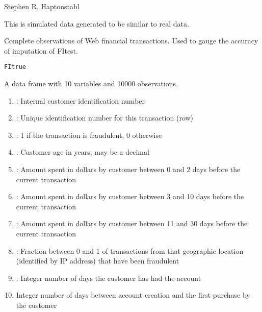 \documentclass[a4paper]{book}
\begin{document}
%
\begin{Author}\relax
Stephen R. Haptonstahl 
\end{Author}
%
\begin{Source}\relax
This is simulated data generated to be similar to real data.
\end{Source}
%
\begin{Description}\relax
Complete observations of Web financial transactions.  
Used to gauge the accuracy of imputation of FItest.
\end{Description}
%
\begin{Usage}
\begin{verbatim}
FItrue
\end{verbatim}
\end{Usage}
%
\begin{Format}
 A data frame with 10 variables and 10000 observations. \begin{enumerate}

\item {}: Internal customer identification number
\item {}: Unique identification number for this transaction (row)
\item {}: 1 if the transaction is fraudulent, 0 otherwise
\item {}: Customer age in years; may be a decimal
\item {}: Amount spent in dollars by customer between 0 and 2 days before the current transaction
\item {}: Amount spent in dollars by customer between 3 and 10 days before the current transaction
\item {}: Amount spent in dollars by customer between 11 and 30 days before the current transaction
\item {}: Fraction between 0 and 1 of transactions from that geographic location (identified by IP address) that have been fraudulent
\item {}: Integer number of days the customer has had the account
\item {} Integer number of days between account creation and the first purchase by the customer

\end{enumerate}
\end{Format}
\end{document}
